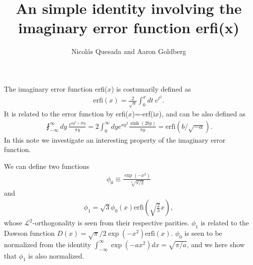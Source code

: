 \documentclass[11pt,letterpaper]{article}
\title{An simple identity involving the imaginary error function erfi(x)}
\author{Nicol\'as Quesada and Aaron Goldberg}
\newcommand{\eq}[1]{\begin{align}#1\end{align}}
\newcommand{\erfi}{\text{erfi}}
\newcommand{\iu}{\text{i}}
\begin{document}
\maketitle
The imaginary error function erfi($x$) is costumarily defined as
\eq{
\erfi(x) = \frac{2}{\sqrt{\pi}} \int_0^x dt \ e^{t^2}.
}
It is related to the error function by erfi($x$)=-\iu erf($\iu x$), and can be also defined as
\eq{
\fint_{-\infty}^{\infty} dy\ \frac{e^{a y^2 +2 b y}}{\pi y} = 2\int_0^\infty dy e^{a y^2}\frac{\sinh(2 b y)}{\pi y}=\erfi(b/\sqrt{-a}).
\label{eq:erfi-principal-integral}
}
In this note we investigate an interesting property of the imaginary error function.

We can define two functions
\eq{
	\phi_0\equiv\frac{\exp\left(-x^2\right)}{\sqrt[4]{\pi/2}}
}
and
\eq{
	\phi_1=\sqrt{3}\phi_0\left(x\right)\erfi\left(\sqrt{\frac{2}{3}}x\right),
}
whose $\mathcal{L}^2$-orthogonality is seen from their respective parities. $\phi_1$ is related to the Dawson function $D\left(x\right)=\sqrt{\pi}/2 \exp\left(-x^2\right)\erfi\left(x\right)$.
$\phi_0$ is seen to be normalized from the identity $\int_{-\infty}^{\infty}\exp\left(-ax^2\right)dx=\sqrt{\pi/a}$, and we here show that $\phi_1$ is also normalized.
\end{document}
